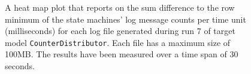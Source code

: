 \begin{figure}[htbp]
\centering
\begin{minipage}{1\textwidth}
  \centering
\end{minipage}
\caption{A heat map plot that reports on the sum difference to the row minimum of the state machines' log message counts per time unit (milliseconds) for each log file generated during run 7 of target model \texttt{CounterDistributor}. Each file has a maximum size of 100MB. The results have been measured over a time span of 30 seconds.}
\label{figure:throughput_difference_counterdistributor_7}
\end{figure}